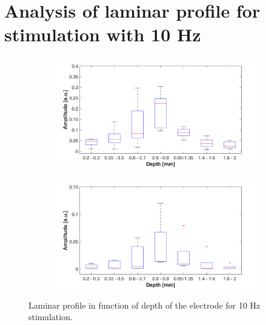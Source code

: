 \documentclass{pracalicmgr}
\begin{document}
\section{Analysis of laminar profile for stimulation with 10 Hz}  
   	\begin{figure}[H]
	\begin{subfigure}{.5\textwidth}
		\centering
		\includegraphics[width=1.\linewidth]{profile_10Hz_wid.png}
		\caption{}
		\label{rys:profil_10Hz_wid1}
	\end{subfigure}%
	\begin{subfigure}{.5\textwidth}
		\centering
		\includegraphics[width=1.\linewidth]{profile_10Hz_wid2.png}
		\caption{}
		\label{rys:profil_10Hz_wid2}
	\end{subfigure}
	
	\caption{Laminar profile in function of depth of the electrode for 10 Hz stimulation.}
	\label{rys:profil_10Hz_wid}
\end{figure}
\end{document}
